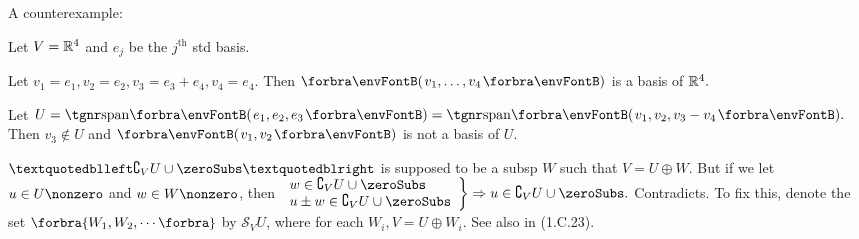 \vspace{8pt}

A counterexample\hspace{1pt}$:$\par\quad
Let $V={\mathbb{R}}^4$ and $e_j$ be the $j^\text{th}$ std basis.\par\quad
Let $v_1=e_1,v_2=e_2,v_3=e_3+e_4,v_4=e_4.$ Then $\Par{v_1,\dots,v_4}$ is a basis of ${\mathbb{R}}^4.$\par\quad
Let $U=\Span{e_1,e_2,e_3}=\Span{v_1,v_2,v_3-v_4}.$ Then $v_3\not\in U$ and $\Par{v_1,v_2}$ is not a basis of $U.$\PfEnd\SepLine

\BulletPointX{}\;\;$“\complement_V U \cup \zeroSubs”$ is supposed to be a subsp $W$ such that $V=U\oplus W$.\TextB{\vspace{4pt}}
But if we let $u\in U\nonzero$ and $w\in W\nonzero$, then $\MathRightBrace{l}{w\in\complement_V U \cup \zeroSubs\\ u\pm w\in\complement_V U \cup \zeroSubs }\Rightarrow u\in\complement_V U \cup \zeroSubs.$ Contradicts.\vspace{4pt}\TextB{}
To fix this, {\Large\envFontLarge denote the set $\Bra{W_1,W_2,\cdots}$ by $\mathcal{S}_V U$,} {\small where for each $W_i,V=U\oplus W_i$. See also in (1.C.23).}\par\SepLine

